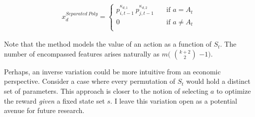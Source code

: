 \begin{gather}\label{separated_poly_extraction}
x_d^{Separated~Poly} = \begin{cases}
p_{i, t-1}^{\kappa_{d,1}} ~ p_{j, t-1}^{\kappa_{d,2}} & \quad \text{if } a = A_t  \\
0 & \quad \text{if } a \ne A_t \\ \end{cases} 
\end{gather}

Note that the method models the value of an action as a function of $S_t$. The number of encompassed features arises naturally as $m($ $k+2\choose2$ $-1)$.


Perhaps, an inverse variation could be more intuitive from an economic perspective. Consider a case where every permutation of $S_t$ would hold a distinct set of parameters. This approach is closer to the notion of selecting $a$ to optimize the reward \emph{given} a fixed state set $s$. I leave this variation open as a potential avenue for future research.